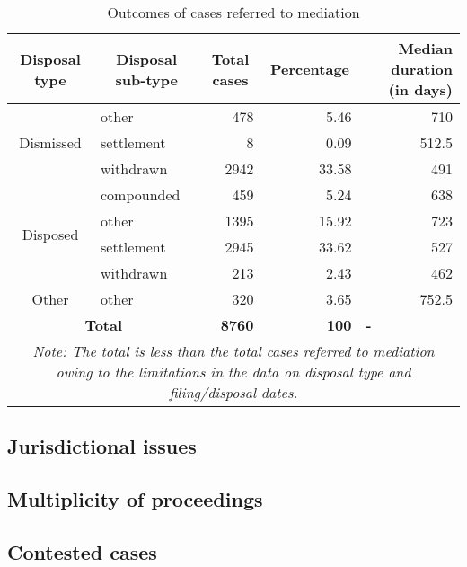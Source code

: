 {\footnotesize \begin{longtable}{@{}clrrr@{}}
\caption{Outcomes of cases referred to mediation}
\label{tab:mediation}\\
\toprule
 \textbf{Disposal type} & \multicolumn{1}{c}{\textbf{Disposal sub-type}} & \multicolumn{1}{c}{\textbf{Total cases}} & \multicolumn{1}{c}{\textbf{Percentage}} & \multicolumn{1}{p{3cm}}{\textbf{Median duration (in days)}} \\
 \midrule
\endhead
\multirow{3}{*}{Dismissed} & other & 478 & 5.46 & 710 \\
 & settlement & 8 & 0.09 & 512.5 \\
 & withdrawn & 2942 & 33.58 & 491 \\
 \midrule
\multirow{4}{*}{Disposed} & compounded & 459 & 5.24 & 638 \\
 & other & 1395 & 15.92 & 723 \\
 & settlement & 2945 & 33.62 & 527 \\
 & withdrawn & 213 & 2.43 & 462 \\
 \midrule
 Other & other & 320 & 3.65 & 752.5 \\
 \midrule
 \multicolumn{2}{c}{\textbf{Total}} & \textbf{8760} & \textbf{100} & \multicolumn{1}{l}{\textbf{-}} \\
 \bottomrule
 \multicolumn{5}{p{11cm}}{{\footnotesize \emph{Note: The total is less than the total cases referred to mediation owing to the limitations in the data on disposal type and filing/disposal dates.}}}
\end{longtable}}

\subsection{Jurisdictional issues}
\subsection{Multiplicity of proceedings}
\subsection{Contested cases}

